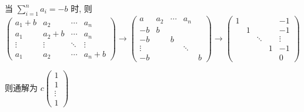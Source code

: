 \begin{enumerate}
			       当 $\sum_{i=1}^{n} a_{i} = -b$ 时, 则 $ \begin{pmatrix}
					       a_{1}+b & a_{2}   & \cdots & a_{n}   \\
					       a_{1}   & a_{2}+b & \cdots & a_{n}   \\
					       \vdots  & \vdots  & \ddots & \vdots  \\
					       a_{1}   & a_{2}   & \cdots & a_{n}+b
				       \end{pmatrix}\to
				       \begin{pmatrix}
					       a      & a_2 & \cdots & a_n        \\
					       -b     & b   &        &            \\
					       -b     &     & b      &            \\
					       \vdots &     &        & \ddots     \\
					       -b     &     &        &        & b
				       \end{pmatrix}
				       \rightarrow \begin{pmatrix}
					       1 &   &        &   & -1     \\
					         & 1 &        &   & -1     \\
					         &   & \ddots &   & \vdots \\
					         &   &        & 1 & -1     \\
					         &   &        &   & 0
				       \end{pmatrix} $

			       则通解为 $c\begin{pmatrix}
					       1      \\
					       1      \\
					       \vdots \\
					       1
				       \end{pmatrix} $
		 \end{enumerate}


 \subsection{} %


